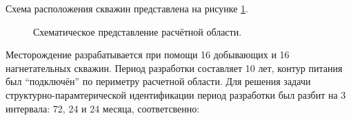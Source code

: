 \documentclass{article}
\begin{document}
Схема расположения скважин представлена на рисунке \ref{fig:map}. 
\begin{figure}
    \begin{minipage}[h]{0.69\linewidth}
    \end{minipage} \hfill
    \begin{minipage}[h]{0.29\linewidth}
    \end{minipage} 
    \caption{Схематическое представление расчётной области.}
    \label{fig:map}
\end{figure}
Месторождение разрабатывается при помощи 16 добывающих и 16 нагнетательных скважин. Период разработки составляет 10 лет, контур питания был “подключён” по периметру расчетной области. Для решения задачи структурно-парамтерической идентификации период разработки был разбит на 3 интервала: 72, 24 и 24 месяца, соответсвенно:
\end{document}
